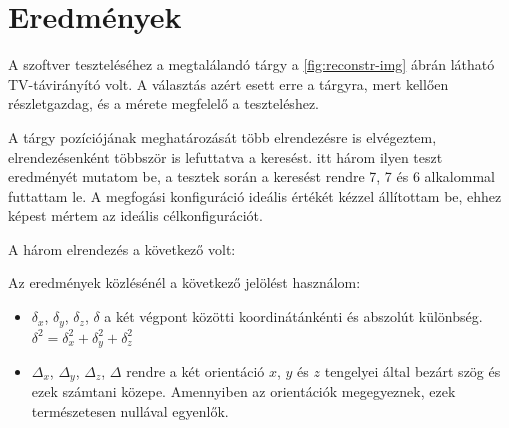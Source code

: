 \chapter{Eredmények}

A szoftver teszteléséhez a megtalálandó tárgy a \ref{fig:reconstr-img} ábrán látható TV-távirányító volt. A választás azért esett erre a tárgyra, mert kellően részletgazdag, és a mérete megfelelő a teszteléshez.

%

A tárgy pozíciójának meghatározását több elrendezésre is elvégeztem, elrendezésenként többször is lefuttatva a keresést. itt három ilyen teszt eredményét mutatom be, a tesztek során a keresést rendre 7, 7 és 6 alkalommal futtattam le. A megfogási konfiguráció ideális értékét kézzel állítottam be, ehhez képest mértem az ideális célkonfigurációt.

A három elrendezés a következő volt:



Az eredmények közlésénél a következő jelölést használom:

\begin{itemize}
\item $\delta_x$, $\delta_y$, $\delta_z$, $\delta$ a két végpont közötti koordinátánkénti és abszolút különbség. $\delta^2=\delta_x^2+\delta_y^2+\delta_z^2$
\item $\Delta_x$, $\Delta_y$, $\Delta_z$, $\Delta$ rendre a két orientáció $x$, $y$ és $z$ tengelyei által bezárt szög és ezek számtani közepe. Amennyiben az orientációk megegyeznek, ezek természetesen nullával egyenlők.
\end{itemize}


